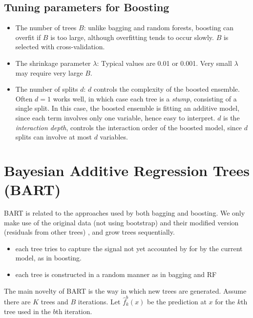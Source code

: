 \documentclass[
  letterpaper,
  DIV=11,
  numbers=noendperiod]{scrreprt}
\providecommand{\tightlist}{%
  \setlength{\itemsep}{0pt}\setlength{\parskip}{0pt}}\usepackage{longtable,booktabs,array}
\begin{document}
\subsection{Tuning parameters for
Boosting}\label{tuning-parameters-for-boosting}

\begin{itemize}
\tightlist
\item
  The number of trees \(B\): unlike bagging and random forests, boosting
  can overfit if \(B\) is too large, although overfitting tends to occur
  slowly. \(B\) is selected with cross-validation.
\item
  The shrinkage parameter \(\lambda\): Typical values are 0.01 or 0.001.
  Very small \(\lambda\) may require very large \(B\).
\item
  The number of splits \(d\): \(d\) controls the complexity of the
  boosted ensemble. Often \(d=1\) works well, in which case each tree is
  a \emph{stump}, consisting of a single split. In this case, the
  boosted ensemble is fitting an additive model, since each term
  involves only one variable, hence easy to interpret. \(d\) is the
  \emph{interaction depth}, controls the interaction order of the
  boosted model, since \(d\) splits can involve at most \(d\) variables.
\end{itemize}

\section{Bayesian Additive Regression Trees
(BART)}\label{bayesian-additive-regression-trees-bart}

BART is related to the approaches used by both bagging and boosting. We
only make use of the original data (not using bootstrap) and their
modified version (residuals from other trees) , and grow trees
sequentially.

\begin{itemize}
\tightlist
\item
  each tree tries to capture the signal not yet accounted by for by the
  current model, as in boosting.
\item
  each tree is constructed in a random manner as in bagging and RF
\end{itemize}

The main novelty of BART is the way in which new trees are generated.
Assume there are \(K\) trees and \(B\) iterations. Let
\(\hat{f}^b_k(x)\) be the prediction at \(x\) for the \(k\)th tree used
in the \(b\)th iteration.
\end{document}
